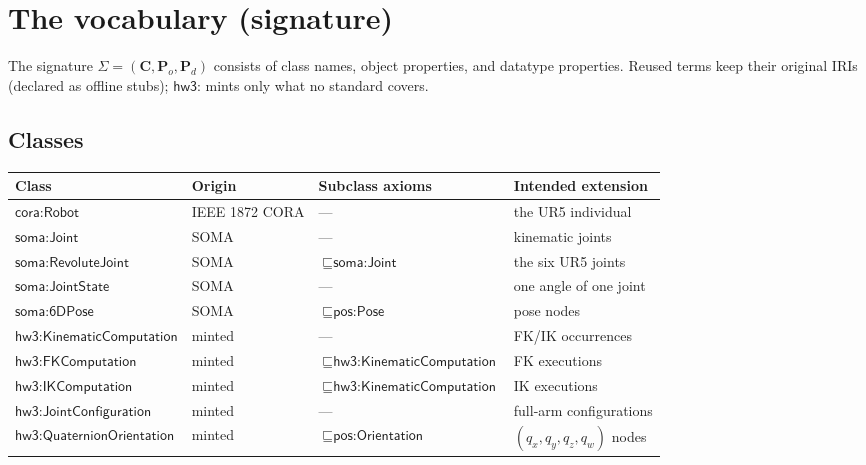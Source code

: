 \documentclass[11pt,a4paper]{article}
\newcommand{\IRI}[1]{\textsf{#1}}                    %
\begin{document}
\section{The vocabulary (signature)}\label{sec:vocab}

The signature $\Sigma = (\mathbf{C}, \mathbf{P}_o, \mathbf{P}_d)$ consists of
class names, object properties, and datatype properties. Reused terms keep their
original IRIs (declared as offline stubs); $\IRI{hw3{:}}$ mints only what no
standard covers.

\subsection{Classes}

\begin{center}\small
\begin{tabular}{@{}llll@{}}
\toprule
Class & Origin & Subclass axioms & Intended extension \\
\midrule
$\IRI{cora{:}Robot}$          & IEEE 1872 CORA & --- & the UR5 individual \\
$\IRI{soma{:}Joint}$          & SOMA & --- & kinematic joints \\
$\IRI{soma{:}RevoluteJoint}$  & SOMA & $\sqsubseteq \IRI{soma{:}Joint}$ & the six UR5 joints \\
$\IRI{soma{:}JointState}$     & SOMA & --- & one angle of one joint \\
$\IRI{soma{:}6DPose}$         & SOMA & $\sqsubseteq \IRI{pos{:}Pose}$ & pose nodes \\
$\IRI{hw3{:}KinematicComputation}$ & minted & --- & FK/IK occurrences \\
$\IRI{hw3{:}FKComputation}$   & minted & $\sqsubseteq \IRI{hw3{:}KinematicComputation}$ & FK executions \\
$\IRI{hw3{:}IKComputation}$   & minted & $\sqsubseteq \IRI{hw3{:}KinematicComputation}$ & IK executions \\
$\IRI{hw3{:}JointConfiguration}$ & minted & --- & full-arm configurations \\
$\IRI{hw3{:}QuaternionOrientation}$ & minted & $\sqsubseteq \IRI{pos{:}Orientation}$ & $(q_x,q_y,q_z,q_w)$ nodes \\
\bottomrule
\end{tabular}
\end{center}
\end{document}
